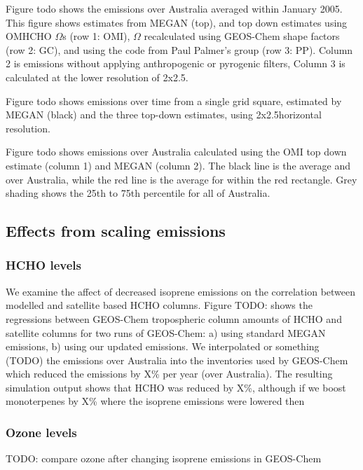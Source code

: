     Figure todo shows the emissions over Australia averaged within January 2005.
    This figure shows estimates from MEGAN (top), and top down estimates using OMHCHO $\Omega$s (row 1: OMI), $\Omega$ recalculated using GEOS-Chem shape factors (row 2: GC), and using the code from Paul Palmer's group (row 3: PP).
    Column 2 is emissions without applying anthropogenic or pyrogenic filters, Column 3 is calculated at the lower resolution of 2x2.5\degr.
    
    Figure todo shows emissions over time from a single grid square, estimated by MEGAN (black) and the three top-down estimates, using 2x2.5\degr horizontal resolution.
    
    Figure todo shows emissions over Australia calculated using the OMI top down estimate (column 1) and MEGAN (column 2). 
    The black line is the average and over Australia, while the red line is the average for within the red rectangle. 
    Grey shading shows the 25th to 75th percentile for all of Australia.
    
  \subsection{Effects from scaling emissions}
    
    \subsubsection{HCHO levels}
      
      We examine the affect of decreased isoprene emissions on the correlation between modelled and satellite based HCHO columns.
      Figure TODO: shows the regressions between GEOS-Chem tropospheric column amounts of HCHO and satellite columns for two runs of GEOS-Chem: a) using standard MEGAN emissions, b) using our updated emissions.
      We interpolated or something (TODO) the emissions over Australia into the inventories used by GEOS-Chem which reduced the emissions by X\% per year (over Australia).
      The resulting simulation output shows that HCHO was reduced by X\%, although if we boost monoterpenes by X\% where the isoprene emissions were lowered then 
  
    \subsubsection{Ozone levels}
  
      TODO: compare ozone after changing isoprene emissions in GEOS-Chem
  
